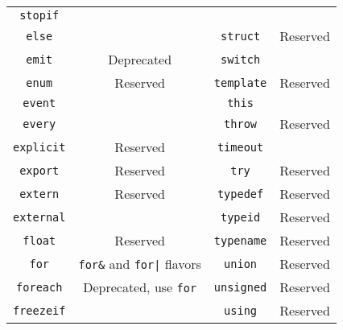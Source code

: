 \begin{table}[\floatpos]
\begin{tabular}{|c|c||c|c|}
    \lstinline"stopif"            &                                         \\
    \lstinline"else"              &                                         &
    \lstinline"struct"            & Reserved                                \\
    \lstinline"emit"              & Deprecated                              &
    \lstinline"switch"            &                                         \\
    \lstinline"enum"              & Reserved                                &
    \lstinline"template"          & Reserved                                \\
    \lstinline"event"             &                                         &
    \lstinline"this"              &                                         \\
    \lstinline"every"             &                                         &
    \lstinline"throw"             & Reserved                                \\
    \lstinline"explicit"          & Reserved                                &
    \lstinline"timeout"           &                                         \\
    \lstinline"export"            & Reserved                                &
    \lstinline"try"               & Reserved                                \\
    \lstinline"extern"            & Reserved                                &
    \lstinline"typedef"           & Reserved                                \\
    \lstinline"external"          &                                         &
    \lstinline"typeid"            & Reserved                                \\
    \lstinline"float"             & Reserved                                &
    \lstinline"typename"          & Reserved                                \\
    \lstinline"for"               & \lstinline|for&| and \lstinline-for|- flavors&
    \lstinline"union"             & Reserved                                \\
    \lstinline"foreach"           & Deprecated, use \lstinline|for|    &
    \lstinline"unsigned"          & Reserved                                \\
    \lstinline"freezeif"          &                                         &
    \lstinline"using"             & Reserved                                \\

\end{tabular}
\end{table}
